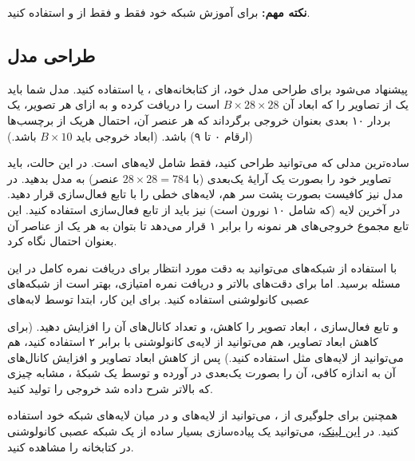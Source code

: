 \documentclass{article}
\begin{document}
\textbf{نکته مهم:}
برای آموزش شبکه خود فقط و فقط از
و
استفاده کنید.

\subsection*{طراحی مدل}

پیشنهاد می‌شود برای طراحی مدل خود، از کتابخانه‌های
\hyperref{https://pytorch.org/}{}{}{}،
\hyperref{https://www.tensorflow.org/}{}{}{}
یا
\hyperref{https://keras.io/}{}{}{}
استفاده کنید. مدل شما باید یک
از تصاویر را که ابعاد آن
$B \times 28 \times 28$
است را دریافت کرده و به ازای هر تصویر، یک بردار ۱۰ بعدی بعنوان خروجی برگرداند که هر عنصر آن، احتمال هریک از برچسب‌ها (ارقام ۰ تا ۹) باشد. (ابعاد خروجی باید
$B \times 10$
باشد.)

ساده‌ترین مدلی که می‌توانید طراحی کنید، فقط شامل لایه‌های
\hyperref{https://pytorch.org/docs/stable/generated/torch.nn.Linear.html}{}{}{}
است. در این حالت، باید تصاویر خود را بصورت یک آرایهٔ یک‌بعدی (با
$28 \times 28 = 784$
عنصر) به مدل بدهید. در مدل نیز کافیست بصورت پشت سر هم، لایه‌های خطی را با تابع فعال‌سازی
\hyperref{https://pytorch.org/docs/stable/generated/torch.nn.ReLU.html}{}{}{}
قرار دهید. در آخرین لایه (که شامل ۱۰ نورون است) نیز باید از تابع فعال‌سازی
\hyperref{https://pytorch.org/docs/stable/generated/torch.nn.Softmax.html}{}{}{}
استفاده کنید. این تابع مجموع خروجی‌های هر نمونه را برابر ۱ قرار می‌دهد تا بتوان به هر یک از عناصر آن بعنوان احتمال نگاه کرد.

با استفاده از شبکه‌های
می‌توانید به دقت مورد انتظار برای دریافت نمره کامل در این مسئله برسید. اما برای دقت‌های بالاتر و دریافت نمره امتیازی، بهتر است از شبکه‌های عصبی کانولوشنی استفاده کنید. برای این کار، ابتدا توسط لابه‌های
و تابع فعال‌سازی
،
ابعاد تصویر را کاهش، و تعداد کانال‌های آن را افزایش دهید. (برای کاهش ابعاد تصاویر، هم می‌توانید از لایه‌ی کانولوشنی با
برابر ۲ استفاده کنید، هم می‌توانید از لایه‌های
مثل
\hyperref{https://pytorch.org/docs/stable/generated/torch.nn.MaxPool2d.html}{}{}{}
استفاده کنید.) پس از کاهش ابعاد تصاویر و افزایش کانال‌های آن به اندازه کافی، آن را بصورت یک‌بعدی در آورده و توسط یک شبکهٔ
،
مشابه چیزی که بالاتر شرح داده شد خروجی را تولید کنید.

همچنین برای جلوگیری از
،
می‌توانید از لایه‌های
و
در میان لایه‌های شبکه خود استفاده کنید. در
\hyperref{https://pytorch.org/tutorials/beginner/blitz/cifar10_tutorial.html}{}{define-a-convolutional-neural-network}{این لینک}،
می‌توانید یک پیاده‌سازی بسیار ساده از یک شبکه عصبی کانولوشنی در کتابخانه
را مشاهده کنید.
\end{document}
